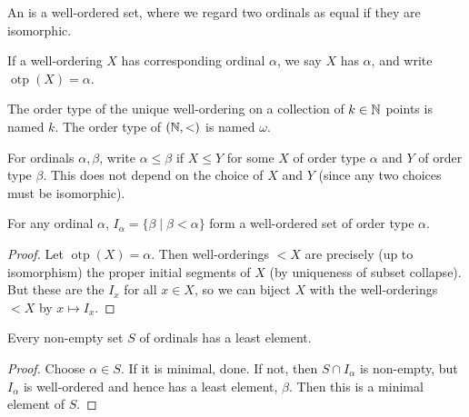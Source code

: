 \documentclass[a4paper, 10pt, twocolumn]{amsart}
\begin{document}
\begin{definition}[Ordinal]
  An  is a well-ordered set, where we regard two ordinals as equal if they are isomorphic.
\end{definition}

\begin{definition}
If a well-ordering $X$ has corresponding ordinal $\alpha$, we say $X$ has  $\alpha$, and write $\operatorname{otp}(X) = \alpha$.
\end{definition}
  
The order type of the unique well-ordering on a collection of $k \in \mathbb{N}$ points is named $k$. The order type of $(\mathbb{N}, <)$ is named $\omega$. 


For ordinals $\alpha, \beta$, write $\alpha \leq \beta$ if $X \leq Y$ for some $X$ of order type $\alpha$ and $Y$ of order type $\beta$. This does not depend on the choice of $X$ and $Y$ (since any two choices must be isomorphic).


\begin{proposition}
  For any ordinal $\alpha$, $I_\alpha = \{\beta \mid \beta < \alpha\}$ form a well-ordered set of order type $\alpha$. 
\end{proposition}
\begin{proof}
  Let $\operatorname{otp}(X) = \alpha$. 
  Then well-orderings $<X$ are precisely (up to isomorphism) the proper initial segments of $X$ (by uniqueness of subset collapse). But these are the $I_x$ for all $x \in X$, so we can biject $X$ with the well-orderings $<X$ by $x \mapsto I_x$.
\end{proof}

\begin{proposition}
  Every non-empty set $S$ of ordinals has a least element.
\end{proposition}
\begin{proof}
Choose $\alpha \in S$. If it is minimal, done. If not, then $S \cap I_\alpha$ is non-empty, but $I_\alpha$ is well-ordered and hence has a least element, $\beta$. Then this is a minimal element of $S$.
\end{proof}
\end{document}

